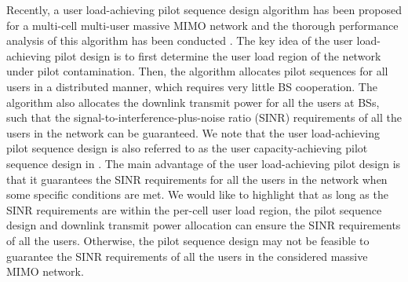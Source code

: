 \documentclass[conference]{IEEEtran}
\begin{document}
Recently, a user load-achieving pilot sequence design algorithm has been proposed for a multi-cell multi-user massive MIMO network \cite{Akbar16} and the thorough performance analysis of this algorithm has been conducted \cite{Akbar16a}. The key idea of the user load-achieving pilot design is to first determine the user load region of the network under pilot contamination. Then, the algorithm allocates pilot sequences for all users in a distributed manner, which requires very little BS cooperation. The algorithm also allocates the downlink transmit power for all the users at BSs, such that the signal-to-interference-plus-noise ratio (SINR) requirements of all the users in the network can be guaranteed. We note that the user load-achieving pilot sequence design \cite{Akbar16a} is also referred to as the user capacity-achieving pilot sequence design in \cite{Akbar16}. The main advantage of the user load-achieving pilot design is that it guarantees the SINR requirements for all the users in the network when some specific conditions are met. We would like to highlight that as long as the SINR requirements are within the per-cell user load region, the pilot sequence design and downlink transmit power allocation can ensure the SINR requirements of all the users. Otherwise, the pilot sequence design may not be feasible to guarantee the SINR requirements of all the users in the considered massive MIMO network.
\end{document}
